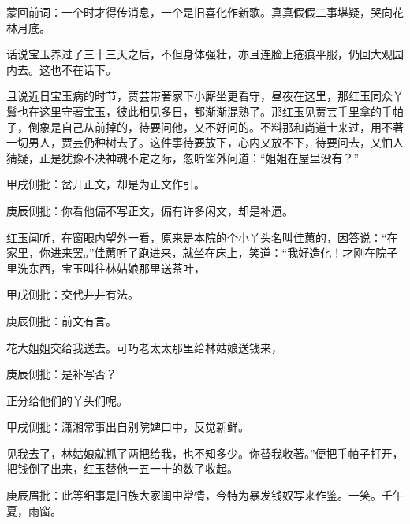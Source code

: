 \begin{parag}
    \begin{note}蒙回前词：一个时才得传消息，一个是旧喜化作新歌。真真假假二事堪疑，哭向花林月底。\end{note}
\end{parag}


\begin{parag}
    话说宝玉养过了三十三天之后，不但身体强壮，亦且连脸上疮痕平服，仍回大观园内去。这也不在话下。
\end{parag}


\begin{parag}
    且说近日宝玉病的时节，贾芸带著家下小厮坐更看守，昼夜在这里，那红玉同众丫鬟也在这里守著宝玉，彼此相见多日，都渐渐混熟了。那红玉见贾芸手里拿的手帕子，倒象是自己从前掉的，待要问他，又不好问的。不料那和尚道士来过，用不著一切男人，贾芸仍种树去了。这件事待要放下，心内又放不下，待要问去，又怕人猜疑，正是犹豫不决神魂不定之际，忽听窗外问道：“姐姐在屋里没有？”\begin{note}甲戌侧批：岔开正文，却是为正文作引。\end{note}\begin{note}庚辰侧批：你看他偏不写正文，偏有许多闲文，却是补遗。\end{note}红玉闻听，在窗眼内望外一看，原来是本院的个小丫头名叫佳蕙的，因答说：“在家里，你进来罢。”佳蕙听了跑进来，就坐在床上，笑道：“我好造化！才刚在院子里洗东西，宝玉叫往林姑娘那里送茶叶，\begin{note}甲戌侧批：交代井井有法。\end{note}\begin{note}庚辰侧批：前文有言。\end{note}花大姐姐交给我送去。可巧老太太那里给林姑娘送钱来，\begin{note}庚辰侧批：是补写否？\end{note}正分给他们的丫头们呢。\begin{note}甲戌侧批：潇湘常事出自别院婢口中，反觉新鲜。\end{note}见我去了，林姑娘就抓了两把给我，也不知多少。你替我收著。”便把手帕子打开，把钱倒了出来，红玉替他一五一十的数了收起。\begin{note}庚辰眉批：此等细事是旧族大家闺中常情，今特为暴发钱奴写来作鉴。一笑。壬午夏，雨窗。\end{note}
\end{parag}


